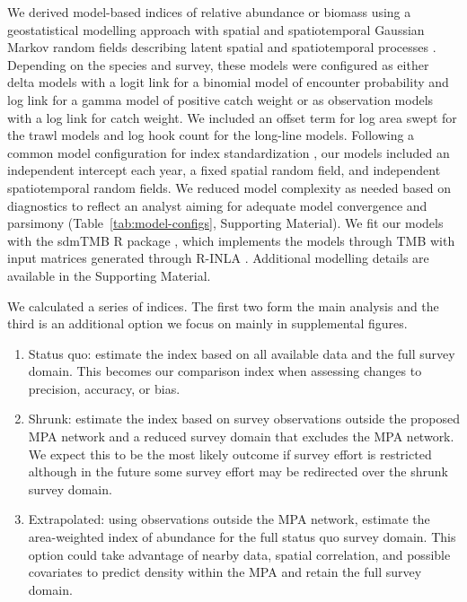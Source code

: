 \documentclass[12pt]{article}
\begin{document}
We derived model-based indices of relative abundance or biomass using a geostatistical modelling approach with spatial and spatiotemporal Gaussian Markov random fields describing latent spatial and spatiotemporal processes \citep[e.g.,][]{shelton2014, thorson2015a, anderson2022}.
Depending on the species and survey, these models were configured as either delta models \citep{aitchison1955} with a logit link for a binomial model of encounter probability  and log link for a gamma model of positive catch weight \citep{schnute2003} or as \citet{tweedie1984} observation models with a log link for catch weight.
We included an offset term \citep[][p.~206]{mccullagh1989} for log area swept for the trawl models and log hook count for the long-line models.
Following a common model configuration for index standardization \citep[e.g.,][]{thorson2015a, thorson2019a}, our models included an independent intercept each year, a fixed spatial random field, and independent spatiotemporal random fields.
We reduced model complexity as needed based on diagnostics to reflect an analyst aiming for adequate model convergence and parsimony (Table~\ref{tab:model-configs}, Supporting Material).
We fit our models with the sdmTMB \textsf{R} package \citep{anderson2022}, which implements the models through TMB \citep{kristensen2016} with input matrices generated through \textsf{R}-INLA \citep{lindgren2015}.
Additional modelling details are available in the Supporting Material.


We calculated a series of indices. The first two form the main analysis and the third is an additional option we focus on mainly in supplemental figures.

\begin{enumerate}

\item Status quo: estimate the index based on all available data and the full survey domain. This becomes our comparison index when assessing changes to precision, accuracy, or bias.

\item Shrunk: estimate the index based on survey observations outside the proposed MPA network and a reduced survey domain that excludes the MPA network. We expect this to be the most likely outcome if survey effort is restricted although in the future some survey effort may be redirected over the shrunk survey domain.

\item Extrapolated: using observations outside the MPA network,  estimate the area-weighted index of abundance for the full status quo survey domain. This option could take advantage of nearby data, spatial correlation, and possible covariates to predict density within the MPA and retain the full survey domain.
\end{enumerate}
\end{document}
